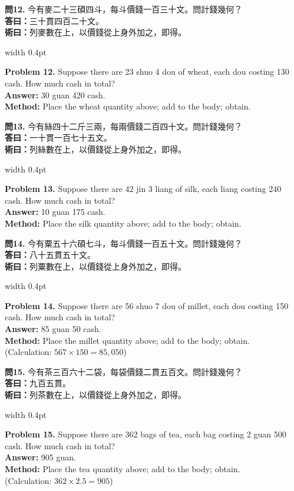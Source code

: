 \documentclass[10pt,a4paper]{article}
\newlength{\cnwidth}
\newlength{\enwidth}
\newcommand{\bilingual}[2]{%
  \noindent%
  \begin{minipage}[t]{\cnwidth}%
    #1%
  \end{minipage}%
  \hfill\vrule width 0.4pt\hfill%
  \begin{minipage}[t]{\enwidth}%
    #2%
  \end{minipage}%
  \par\smallskip%
}
\begin{document}
\bilingual{%
  \textbf{問12.}
  今有麥二十三碩四斗，每斗價錢一百三十文。問計錢幾何？\\
  \textbf{答曰：}三十貫四百二十文。\\
  \textbf{術曰：}列麥數在上，以價錢從上身外加之，即得。
}{%
  \textbf{Problem 12.}
  Suppose there are 23 shuo 4 dou of wheat, each dou costing 130 cash.
  How much cash in total?\\
  \textbf{Answer:} 30 guan 420 cash.\\
  \textbf{Method:} Place the wheat quantity above; add to the body; obtain.
}

\bilingual{%
  \textbf{問13.}
  今有絲四十二斤三兩，每兩價錢二百四十文。問計錢幾何？\\
  \textbf{答曰：}一十貫一百七十五文。\\
  \textbf{術曰：}列絲數在上，以價錢從上身外加之，即得。
}{%
  \textbf{Problem 13.}
  Suppose there are 42 jin 3 liang of silk, each liang costing 240 cash.
  How much cash in total?\\
  \textbf{Answer:} 10 guan 175 cash.\\
  \textbf{Method:} Place the silk quantity above; add to the body; obtain.
}

\bilingual{%
  \textbf{問14.}
  今有粟五十六碩七斗，每斗價錢一百五十文。問計錢幾何？\\
  \textbf{答曰：}八十五貫五十文。\\
  \textbf{術曰：}列粟數在上，以價錢從上身外加之，即得。
}{%
  \textbf{Problem 14.}
  Suppose there are 56 shuo 7 dou of millet, each dou costing 150 cash.
  How much cash in total?\\
  \textbf{Answer:} 85 guan 50 cash.\\
  \textbf{Method:} Place the millet quantity above; add to the body; obtain.\\
  (Calculation: $567 \times 150 = 85{,}050$)
}

\bilingual{%
  \textbf{問15.}
  今有茶三百六十二袋，每袋價錢二貫五百文。問計錢幾何？\\
  \textbf{答曰：}九百五貫。\\
  \textbf{術曰：}列茶數在上，以價錢從上身外加之，即得。
}{%
  \textbf{Problem 15.}
  Suppose there are 362 bags of tea, each bag costing 2 guan 500 cash.
  How much cash in total?\\
  \textbf{Answer:} 905 guan.\\
  \textbf{Method:} Place the tea quantity above; add to the body; obtain.\\
  (Calculation: $362 \times 2.5 = 905$)
}
\end{document}
